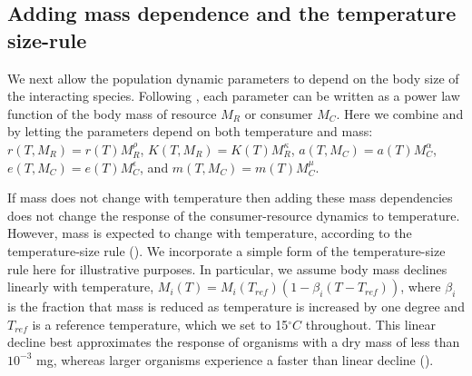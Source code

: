 \documentclass[11pt]{article}
\begin{document}
\subsection*{Adding mass dependence and the temperature size-rule}

We next allow the population dynamic parameters to depend on the body size of the interacting species.
Following \cite{DeLong2015}, each parameter can be written as a power law function of the body mass of resource $M_R$ or consumer $M_C$.
Here we combine \cite{DeLong2015} and \cite{Gilbert2014} by letting the parameters depend on both temperature and mass: $r(T, M_R) = r(T) M_R^\rho$, $K(T, M_R) = K(T) M_R^\kappa$, $a(T, M_C) = a(T) M_C^\alpha$, $e(T, M_C) = e(T) M_C^\epsilon$, and $m(T, M_C) = m(T) M_C^\mu$.

If mass does not change with temperature then adding these mass dependencies does not change the response of the consumer-resource dynamics to temperature.
However, mass is expected to change with temperature, according to the temperature-size rule (\cite{Atkinson1994}).
We incorporate a simple form of the temperature-size rule here for illustrative purposes.
In particular, we assume body mass declines linearly with temperature, $M_i(T) = M_i(T_{ref}) (1 - \beta_i (T - T_{ref}))$, where $\beta_i$ is the fraction that mass is reduced as temperature is increased by one degree and $T_{ref}$ is a reference temperature, which we set to 15$^\circ C$ throughout.
This linear decline best approximates the response of organisms with a dry mass of less than $10^{-3}$ mg, whereas larger organisms experience a faster than linear decline (\cite{Forster2012}).
\end{document}
